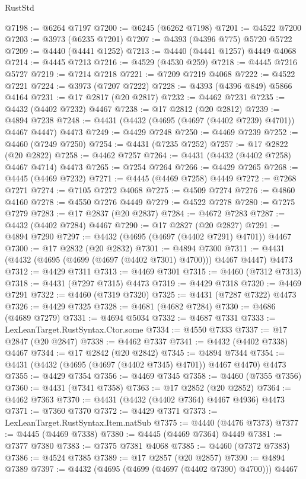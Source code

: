 \begin{lexlean}{RustStd}
\begin{coremodule}
@7198 := @6264 @7197
@7200 := @6245 (@6262 @7198)
@7201 := @4522 @7200
@7203 := @3973 (@6235 @7201)
@7207 := @4393 (@4396 @775) @5720 @5722
@7209 := @4440 (@4441 @1252)
@7213 := @4440 (@4441 @1257) @4449 @4068
@7214 := @4445 @7213
@7216 := @4529 (@4530 @259)
@7218 := @4445 @7216 @5727
@7219 := @7214 @7218
@7221 := @7209 @7219 @4068
@7222 := @4522 @7221
@7224 := @3973 (@7207 @7222)
@7228 := @4393 (@4396 @849) @5866 @4164
@7231 := @17 @2817 (@20 @2817)
@7232 := @4462 @7231
@7235 := @4432 (@4402 @7232) @4467
@7238 := @17 @2812 (@20 @2812)
@7239 := @4894 @7238
@7248 := @4431 (@4432 (@4695 (@4697 (@4402 @7239) @4701)) @4467 @4447) @4473
@7249 := @4429 @7248
@7250 := @4469 @7239
@7252 := @4460 (@7249 @7250)
@7254 := @4431 (@7235 @7252)
@7257 := @17 @2822 (@20 @2822)
@7258 := @4462 @7257
@7264 := @4431 (@4432 (@4402 @7258) @4467 @4714) @4473
@7265 := @7254 @7264
@7266 := @4429 @7265
@7268 := @4445 (@4469 @7232)
@7271 := @4445 (@4469 @7258) @4449
@7272 := @7268 @7271
@7274 := @7105 @7272 @4068
@7275 := @4509 @7274
@7276 := @4860 @4160
@7278 := @4550 @7276 @4449
@7279 := @4522 @7278
@7280 := @7275 @7279
@7283 := @17 @2837 (@20 @2837)
@7284 := @4672 @7283
@7287 := @4432 (@4402 @7284) @4467
@7290 := @17 @2827 (@20 @2827)
@7291 := @4894 @7290
@7297 := @4432 (@4695 (@4697 (@4402 @7291) @4701)) @4467
@7300 := @17 @2832 (@20 @2832)
@7301 := @4894 @7300
@7311 := @4431 (@4432 (@4695 (@4699 (@4697 (@4402 @7301) @4700))) @4467 @4447) @4473
@7312 := @4429 @7311
@7313 := @4469 @7301
@7315 := @4460 (@7312 @7313)
@7318 := @4431 (@7297 @7315) @4473
@7319 := @4429 @7318
@7320 := @4469 @7291
@7322 := @4460 (@7319 @7320)
@7325 := @4431 (@7287 @7322) @4473
@7326 := @4429 @7325
@7328 := @4681 (@4682 @7284)
@7330 := @4686 (@4689 @7279)
@7331 := @4694 @5034
@7332 := @4687 @7331
@7333 := LexLeanTarget.RustSyntax.Ctor.some
@7334 := @4550 @7333
@7337 := @17 @2847 (@20 @2847)
@7338 := @4462 @7337
@7341 := @4432 (@4402 @7338) @4467
@7344 := @17 @2842 (@20 @2842)
@7345 := @4894 @7344
@7354 := @4431 (@4432 (@4695 (@4697 (@4402 @7345) @4701)) @4467 @4470) @4473
@7355 := @4429 @7354
@7356 := @4469 @7345
@7358 := @4460 (@7355 @7356)
@7360 := @4431 (@7341 @7358)
@7363 := @17 @2852 (@20 @2852)
@7364 := @4462 @7363
@7370 := @4431 (@4432 (@4402 @7364) @4467 @4936) @4473
@7371 := @7360 @7370
@7372 := @4429 @7371
@7373 := LexLeanTarget.RustSyntax.Item.natSub
@7375 := @4440 (@4476 @7373)
@7377 := @4445 (@4469 @7338)
@7380 := @4445 (@4469 @7364) @4449
@7381 := @7377 @7380
@7383 := @7375 @7381 @4068
@7385 := @4460 (@7372 @7383)
@7386 := @4524 @7385
@7389 := @17 @2857 (@20 @2857)
@7390 := @4894 @7389
@7397 := @4432 (@4695 (@4699 (@4697 (@4402 @7390) @4700))) @4467

\end{coremodule}
\end{lexlean}

